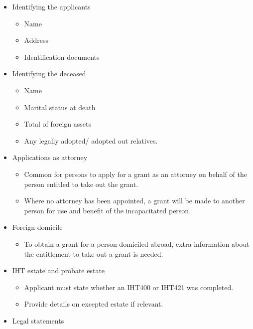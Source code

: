 \documentclass[
]{article}
\providecommand{\tightlist}{%
  \setlength{\itemsep}{0pt}\setlength{\parskip}{0pt}}
\begin{document}
\begin{itemize}
\tightlist
\item
  Identifying the applicants

  \begin{itemize}
  \tightlist
  \item
    Name
  \item
    Address
  \item
    Identification documents
  \end{itemize}
\item
  Identifying the deceased

  \begin{itemize}
  \tightlist
  \item
    Name
  \item
    Marital status at death
  \item
    Total of foreign assets
  \item
    Any legally adopted/ adopted out relatives.
  \end{itemize}
\item
  Applications as attorney

  \begin{itemize}
  \tightlist
  \item
    Common for persons to apply for a grant as an attorney on behalf of
    the person entitled to take out the grant.
  \item
    Where no attorney has been appointed, a grant will be made to
    another person for use and benefit of the incapacitated person.
  \end{itemize}
\item
  Foreign domicile

  \begin{itemize}
  \tightlist
  \item
    To obtain a grant for a person domiciled abroad, extra information
    about the entitlement to take out a grant is needed.
  \end{itemize}
\item
  IHT estate and probate estate

  \begin{itemize}
  \tightlist
  \item
    Applicant must state whether an IHT400 or IHT421 was completed.
  \item
    Provide details on excepted estate if relevant.
  \end{itemize}
\item
  Legal statements


\end{itemize}
\end{document}
